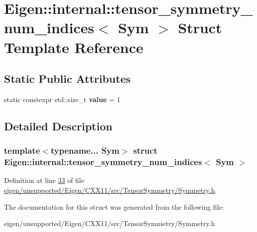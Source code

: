 \hypertarget{struct_eigen_1_1internal_1_1tensor__symmetry__num__indices}{}\section{Eigen\+:\+:internal\+:\+:tensor\+\_\+symmetry\+\_\+num\+\_\+indices$<$ Sym $>$ Struct Template Reference}
\label{struct_eigen_1_1internal_1_1tensor__symmetry__num__indices}
\subsection*{Static Public Attributes}
\begin{DoxyCompactItemize}
\item 
\mbox{\label{struct_eigen_1_1internal_1_1tensor__symmetry__num__indices_a30e3f9cbf0e6486231a47b88310e1a85}} 
static constexpr std\+::size\+\_\+t {\bfseries value} = 1
\end{DoxyCompactItemize}


\subsection{Detailed Description}
\subsubsection*{template$<$typename... Sym$>$\newline
struct Eigen\+::internal\+::tensor\+\_\+symmetry\+\_\+num\+\_\+indices$<$ Sym $>$}



Definition at line \hyperlink{eigen_2unsupported_2_eigen_2_c_x_x11_2src_2_tensor_symmetry_2_symmetry_8h_source_l00033}{33} of file \hyperlink{eigen_2unsupported_2_eigen_2_c_x_x11_2src_2_tensor_symmetry_2_symmetry_8h_source}{eigen/unsupported/\+Eigen/\+C\+X\+X11/src/\+Tensor\+Symmetry/\+Symmetry.\+h}.



The documentation for this struct was generated from the following file\+:\begin{DoxyCompactItemize}
\item 
eigen/unsupported/\+Eigen/\+C\+X\+X11/src/\+Tensor\+Symmetry/\+Symmetry.\+h\end{DoxyCompactItemize}
